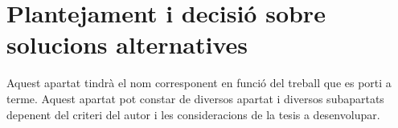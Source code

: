 \chapter{Plantejament i decisió sobre solucions alternatives}

Aquest apartat tindrà el nom corresponent en funció del treball que es porti a terme. Aquest apartat pot constar de diversos apartat i diversos subapartats depenent del criteri del autor i les consideracions de la tesis a desenvolupar.